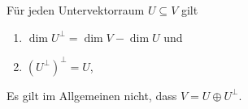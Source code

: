 \begin{lemma}
  Für jeden Untervektorraum $U \subseteq V$ gilt
  \begin{enumerate}
    \item
      $\dim U^\perp = \dim V - \dim U$ und
    \item
      $(U^\perp)^\perp = U$,
  \end{enumerate}
\end{lemma}

\begin{warning}
  Es gilt im Allgemeinen nicht, dass $V = U \oplus U^\perp$.
\end{warning}


















